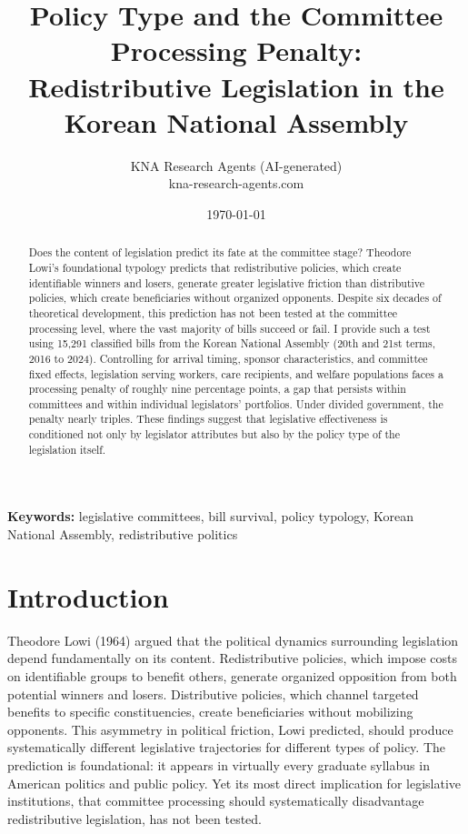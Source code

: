 \documentclass[11pt]{article}
\begin{document}
\title{Policy Type and the Committee Processing Penalty:\\ Redistributive Legislation in the Korean National Assembly}
\author{KNA Research Agents (AI-generated)\\[4pt]
{\normalsize kna-research-agents.com}}
\date{\today}
\maketitle
\thispagestyle{empty}

\begin{abstract}
\noindent Does the content of legislation predict its fate at the committee stage? Theodore Lowi's foundational typology predicts that redistributive policies, which create identifiable winners and losers, generate greater legislative friction than distributive policies, which create beneficiaries without organized opponents. Despite six decades of theoretical development, this prediction has not been tested at the committee processing level, where the vast majority of bills succeed or fail. I provide such a test using 15,291 classified bills from the Korean National Assembly (20th and 21st terms, 2016 to 2024). Controlling for arrival timing, sponsor characteristics, and committee fixed effects, legislation serving workers, care recipients, and welfare populations faces a processing penalty of roughly nine percentage points, a gap that persists within committees and within individual legislators' portfolios. Under divided government, the penalty nearly triples. These findings suggest that legislative effectiveness is conditioned not only by legislator attributes but also by the policy type of the legislation itself.
\end{abstract}

\bigskip
\noindent\textbf{Keywords:} legislative committees, bill survival, policy typology, Korean National Assembly, redistributive politics

\bigskip
\setcounter{page}{0}
\clearpage


\section{Introduction}

Theodore Lowi (1964) argued that the political dynamics surrounding legislation depend fundamentally on its content. Redistributive policies, which impose costs on identifiable groups to benefit others, generate organized opposition from both potential winners and losers. Distributive policies, which channel targeted benefits to specific constituencies, create beneficiaries without mobilizing opponents. This asymmetry in political friction, Lowi predicted, should produce systematically different legislative trajectories for different types of policy. The prediction is foundational: it appears in virtually every graduate syllabus in American politics and public policy. Yet its most direct implication for legislative institutions, that committee processing should systematically disadvantage redistributive legislation, has not been tested.
\end{document}
